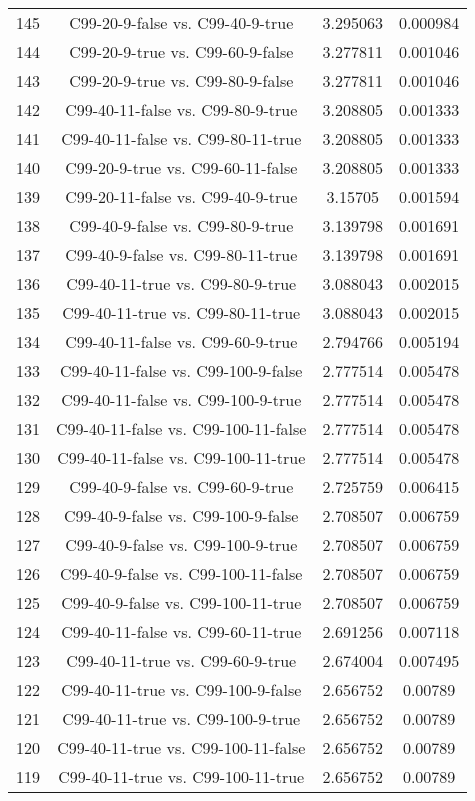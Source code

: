 \documentclass[a4paper,10pt]{article}
\begin{document}
\begin{landscape}
\begin{table}[!htp]
\begin{tabular}{cccc}
145&C99-20-9-false vs. C99-40-9-true&3.295063&0.000984\\
144&C99-20-9-true vs. C99-60-9-false&3.277811&0.001046\\
143&C99-20-9-true vs. C99-80-9-false&3.277811&0.001046\\
142&C99-40-11-false vs. C99-80-9-true&3.208805&0.001333\\
141&C99-40-11-false vs. C99-80-11-true&3.208805&0.001333\\
140&C99-20-9-true vs. C99-60-11-false&3.208805&0.001333\\
139&C99-20-11-false vs. C99-40-9-true&3.15705&0.001594\\
138&C99-40-9-false vs. C99-80-9-true&3.139798&0.001691\\
137&C99-40-9-false vs. C99-80-11-true&3.139798&0.001691\\
136&C99-40-11-true vs. C99-80-9-true&3.088043&0.002015\\
135&C99-40-11-true vs. C99-80-11-true&3.088043&0.002015\\
134&C99-40-11-false vs. C99-60-9-true&2.794766&0.005194\\
133&C99-40-11-false vs. C99-100-9-false&2.777514&0.005478\\
132&C99-40-11-false vs. C99-100-9-true&2.777514&0.005478\\
131&C99-40-11-false vs. C99-100-11-false&2.777514&0.005478\\
130&C99-40-11-false vs. C99-100-11-true&2.777514&0.005478\\
129&C99-40-9-false vs. C99-60-9-true&2.725759&0.006415\\
128&C99-40-9-false vs. C99-100-9-false&2.708507&0.006759\\
127&C99-40-9-false vs. C99-100-9-true&2.708507&0.006759\\
126&C99-40-9-false vs. C99-100-11-false&2.708507&0.006759\\
125&C99-40-9-false vs. C99-100-11-true&2.708507&0.006759\\
124&C99-40-11-false vs. C99-60-11-true&2.691256&0.007118\\
123&C99-40-11-true vs. C99-60-9-true&2.674004&0.007495\\
122&C99-40-11-true vs. C99-100-9-false&2.656752&0.00789\\
121&C99-40-11-true vs. C99-100-9-true&2.656752&0.00789\\
120&C99-40-11-true vs. C99-100-11-false&2.656752&0.00789\\
119&C99-40-11-true vs. C99-100-11-true&2.656752&0.00789\\

\end{tabular}
\end{table}
\end{landscape}
\end{document}
